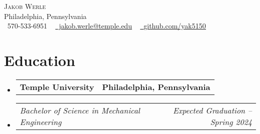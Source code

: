 \documentclass[letterpaper,11pt]{article}
\makeatletter
\newcommand{\company}[2]{
  \vspace{-2pt}\item
    \begin{tabular*}{1.0\textwidth}[t]{l@{\extracolsep{\fill}}r}
      \textbf{#1} & \textbf{\small #2} \\
    \end{tabular*}\vspace{-18pt}
}
\newcommand{\role}[2]{
  \vspace{-5pt}\item
    \begin{tabular*}{1.0\textwidth}[t]{l@{\extracolsep{\fill}}r}
      \textit{\small#1} & \textit{\small #2} \\
    \end{tabular*}\vspace{-7pt}
}
\newcommand{\companyListStart}{\begin{itemize}[leftmargin=0.0in, label={}]}
\newcommand{\companyListEnd}{\end{itemize}}
\makeatother
\begin{document}

\begin{center}
    {\Huge \scshape Jakob Werle} \\ \vspace{1pt}
    Philadelphia, Pennsylvania \\ \vspace{1pt}
    \small \raisebox{-0.1\height}\faPhone\ 570-533-6951 ~ \href{mailto:jakob.werle@temple.edu}{\raisebox{-0.2\height}\faEnvelope\ jakob.werle@temple.edu} ~ 
    \href{https://github.com/yak5150}{\raisebox{-0.2\height}\faGithub\ \underline{github.com/yak5150}}
    \vspace{-8pt}
\end{center}

\section{Education}
  \companyListStart
    \company{Temple University}{Philadelphia, Pennsylvania}
      \role{Bachelor of Science in Mechanical Engineering}{Expected Graduation -- Spring 2024}
  \companyListEnd

\end{document}
